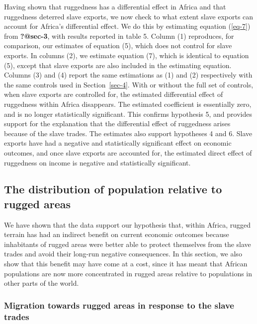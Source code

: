 \documentclass[
  letterpaper,
  DIV=11,
  numbers=noendperiod]{scrartcl}
\begin{document}
Having shown that ruggedness has a differential effect in Africa and
that ruggedness deterred slave exports, we now check to what extent
slave exports can account for Africa's differential effect. We do this
by estimating equation (\ref{eq-7}) from \textbf{?@sec-3}, with results
reported in table 5. Column (1) reproduces, for comparison, our
estimates of equation (5), which does not control for slave exports. In
columns (2), we estimate equation (7), which is identical to equation
(5), except that slave exports are also included in the estimating
equation. Columns (3) and (4) report the same estimations as (1) and (2)
respectively with the same controls used in Section~\ref{sec-4}. With or
without the full set of controls, when slave exports are controlled for,
the estimated differential effect of ruggedness within Africa
disappears. The estimated coefficient is essentially zero, and is no
longer statistically significant. This confirms hypothesis 5, and
provides support for the explanation that the differential effect of
ruggedness arises because of the slave trades. The estimates also
support hypotheses 4 and 6. Slave exports have had a negative and
statistically significant effect on economic outcomes, and once slave
exports are accounted for, the estimated direct effect of ruggedness on
income is negative and statistically significant.

\subsection{The distribution of population relative to rugged
areas}\label{the-distribution-of-population-relative-to-rugged-areas}

We have shown that the data support our hypothesis that, within Africa,
rugged terrain has had an indirect benefit on current economic outcomes
because inhabitants of rugged areas were better able to protect
themselves from the slave trades and avoid their long-run negative
consequences. In this section, we also show that this benefit may have
come at a cost, since it has meant that African populations are now more
concentrated in rugged areas relative to populations in other parts of
the world.

\subsubsection{Migration towards rugged areas in response to the slave
trades}\label{migration-towards-rugged-areas-in-response-to-the-slave-trades}
\end{document}
